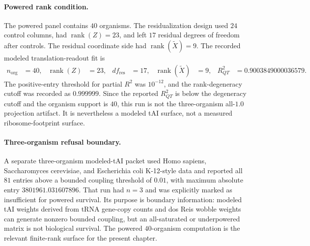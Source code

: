 \paragraph{Powered rank condition.}
The powered panel contains $40$ organisms.  The residualization design used $24$ control columns, had $\operatorname{rank}(Z)=23$, and left $17$ residual degrees of freedom after controls.  The residual coordinate side had $\operatorname{rank}(\widetilde X)=9$.  The recorded modeled translation-readout fit is
$$
\begin{aligned}
 n_{\mathrm{org}}&=40, &
 \operatorname{rank}(Z)&=23, &
 df_{\mathrm{res}}&=17, &
 \operatorname{rank}(\widetilde X)&=9, &
 R^2_{QT}&=0.9003849000036579 .
\end{aligned}
$$
The positive-entry threshold for partial $R^2$ was $10^{-12}$, and the rank-degeneracy cutoff was recorded as $0.999999$.  Since the reported $R^2_{QT}$ is below the degeneracy cutoff and the organism support is $40$, this run is not the three-organism all-$1.0$ projection artifact.  It is nevertheless a modeled tAI surface, not a measured ribosome-footprint surface.

\paragraph{Three-organism refusal boundary.}
A separate three-organism modeled-tAI packet used Homo sapiens, Saccharomyces cerevisiae, and Escherichia coli K-12-style data and reported all $81$ entries above a bounded coupling threshold of $0.01$, with maximum absolute entry $3801961.031607896$.  That run had $n=3$ and was explicitly marked as insufficient for powered survival.  Its purpose is boundary information: modeled tAI weights derived from tRNA gene-copy counts and dos Reis wobble weights can generate nonzero bounded coupling, but an all-saturated or underpowered matrix is not biological survival.  The powered $40$-organism computation is the relevant finite-rank surface for the present chapter.

